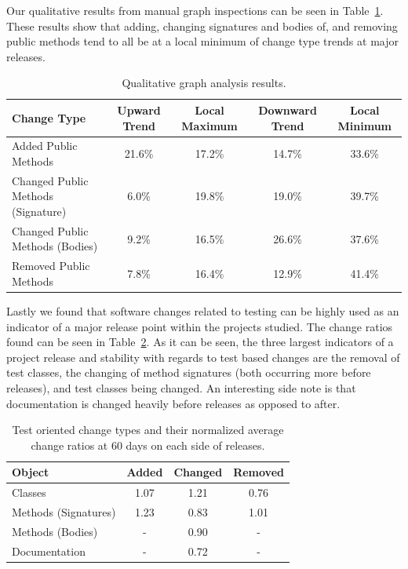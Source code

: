 \documentclass[conference]{IEEEtran}
\begin{document}
Our qualitative results from manual graph inspections can be seen in Table~\ref{tab:qual}. These results show that adding, changing signatures and bodies of, and
removing public methods tend to all be at a local minimum of change type trends at major releases.

\begin{table}[tb!]
\begin{center}
\begin{tabular}{| l | c | c | c | c |}
\hline
Change Type & Upward Trend & Local Maximum & Downward Trend & Local Minimum\\
\hline
Added Public Methods & 21.6\% & 17.2\% & 14.7\% & 33.6\% \\
Changed Public Methods (Signature) & 6.0\% & 19.8\% & 19.0\% & 39.7\% \\
Changed Public Methods (Bodies) & 9.2\% & 16.5\% & 26.6\% & 37.6\% \\
Removed Public Methods & 7.8\% & 16.4\% & 12.9\% & 41.4\% \\
\hline
\end{tabular}
\end{center}
\caption{Qualitative graph analysis results. \label{tab:qual}}
\end{table}

Lastly we found that software changes related to testing can be highly used as an indicator of a major release point within the projects studied. The change
ratios found can be seen in Table~\ref{tab:test}. As it can be seen, the three largest indicators of a project release and stability with regards to test based
changes are the removal of test classes, the changing of method signatures (both occurring more before releases), and test classes being changed. An interesting
side note is that documentation is changed heavily before releases as opposed to after.

\begin{table}[h]
\begin{center}
\begin{tabular}{| l | c | c | c |}
\hline
Object & Added & Changed & Removed\\
\hline
Classes & 1.07 & 1.21 & 0.76 \\
Methods (Signatures) & 1.23 & 0.83 & 1.01 \\
Methods (Bodies) & - & 0.90 & - \\
Documentation & - & 0.72 & - \\
\hline
\end{tabular}
\end{center}
\caption{Test oriented change types and their normalized average change ratios at 60 days on each side of releases. \label{tab:test}}
\end{table}
\end{document}
